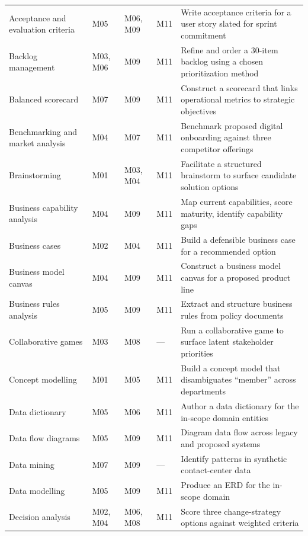 \documentclass[11pt,letterpaper,oneside]{report}
\begin{document}
\begin{landscape}
\begin{longtable}{@{}R{4.45cm} R{2.10cm} R{2.55cm} R{1.55cm} R{8.40cm}@{}}
Acceptance and evaluation criteria & M05 & M06, M09 & M11 & Write acceptance criteria for a user story slated for sprint commitment \\
Backlog management                 & M03, M06 & M09 & M11 & Refine and order a 30-item backlog using a chosen prioritization method \\
Balanced scorecard                 & M07 & M09 & M11 & Construct a scorecard that links operational metrics to strategic objectives \\
Benchmarking and market analysis   & M04 & M07 & M11 & Benchmark proposed digital onboarding against three competitor offerings \\
Brainstorming                      & M01 & M03, M04 & M11 & Facilitate a structured brainstorm to surface candidate solution options \\
Business capability analysis       & M04 & M09 & M11 & Map current capabilities, score maturity, identify capability gaps \\
Business cases                     & M02 & M04 & M11 & Build a defensible business case for a recommended option \\
Business model canvas              & M04 & M09 & M11 & Construct a business model canvas for a proposed product line \\
Business rules analysis            & M05 & M09 & M11 & Extract and structure business rules from policy documents \\
Collaborative games                & M03 & M08 & ---  & Run a collaborative game to surface latent stakeholder priorities \\
Concept modelling                  & M01 & M05 & M11 & Build a concept model that disambiguates ``member'' across departments \\
Data dictionary                    & M05 & M06 & M11 & Author a data dictionary for the in-scope domain entities \\
Data flow diagrams                 & M05 & M09 & M11 & Diagram data flow across legacy and proposed systems \\
Data mining                        & M07 & M09 & ---  & Identify patterns in synthetic contact-center data \\
Data modelling                     & M05 & M09 & M11 & Produce an ERD for the in-scope domain \\
Decision analysis                  & M02, M04 & M06, M08 & M11 & Score three change-strategy options against weighted criteria \\

\end{longtable}
\end{landscape}
\end{document}
